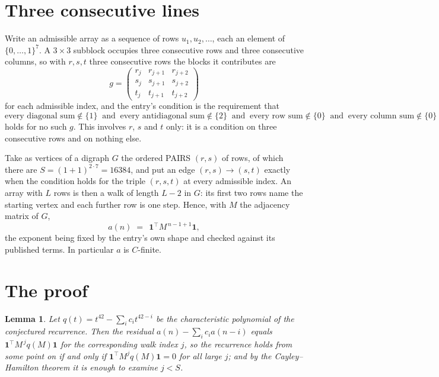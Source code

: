 \documentclass[11pt,a4paper]{article}
\theoremstyle{plain}
\newtheorem{lemma}[theorem]{Lemma}
\theoremstyle{definition}
\begin{document}
\section{Three consecutive lines}

Write an admissible array as a sequence of rows $u_1,u_2,\dots$, each an element of
$\{0,\dots,1\}^{7}$. A $3\times3$ subblock occupies three consecutive rows and
three consecutive columns, so with $r,s,t$ three consecutive rows the blocks it
contributes are
\[
g=\begin{pmatrix}r_j&r_{j+1}&r_{j+2}\\ s_j&s_{j+1}&s_{j+2}\\ t_j&t_{j+1}&t_{j+2}\end{pmatrix}
\]
for each admissible index, and the entry's condition is the requirement that
\[
\text{every diagonal sum} \notin \{1\}\ \text{ and }\ \text{every antidiagonal sum} \notin \{2\}\ \text{ and }\ \text{every row sum} \notin \{0\}\ \text{ and }\ \text{every column sum} \notin \{0\}
\]
holds for no such $g$. This involves $r$, $s$ and $t$ only: it is a condition on
three consecutive rows and on nothing else.

Take as vertices of a digraph $G$ the ordered PAIRS $(r,s)$ of rows, of which there are
$S=(1+1)^{2\cdot7}=16384$, and put an edge $(r,s)\to(s,t)$ exactly when the condition
holds for the triple $(r,s,t)$ at every admissible index. An array with $L$ rows is then a
walk of length $L-2$ in $G$: its first two rows name the starting vertex and each further
row is one step. Hence, with $M$ the adjacency matrix of $G$,
\[
a(n)\;=\;\,\mathbf{1}^{\!\top}M^{\,n-1+1}\mathbf{1},
\]
the exponent being fixed by the entry's own shape and checked against its published terms.
In particular $a$ is $C$-finite.

\section{The proof}

\begin{lemma}\label{lem:crit}
Let $q(t)=t^{42}-\sum_i c_it^{42-i}$ be the characteristic polynomial of the
conjectured recurrence. Then the residual $a(n)-\sum_ic_ia(n-i)$ equals
$\mathbf{1}^{\!\top}M^{\,j}q(M)\mathbf{1}$ for the corresponding walk index
$j$, so the recurrence holds from some point on if and only if
$\mathbf{1}^{\!\top}M^{j}q(M)\mathbf{1}=0$ for all large $j$; and by the
Cayley--Hamilton theorem it is enough to examine $j<S$.
\end{lemma}
\end{document}
